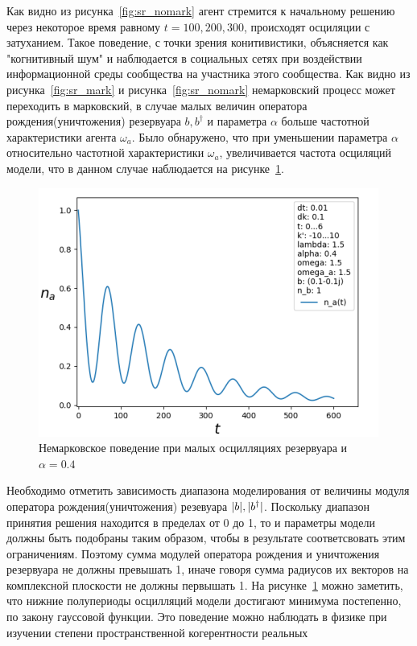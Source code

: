 Как видно из рисунка~\ref{fig:sr_nomark} агент стремится к начальному решению через некоторое время
равному $t = 100, 200, 300$, происходят осциляции с затуханием.
Такое поведение, с точки зрения конитивистики, объясняется как "когнитивный шум" и наблюдается в
социальных сетях при воздействии информационной среды сообщества на участника этого сообщества.
Как видно из рисунка~\ref{fig:sr_mark} и рисунка~\ref{fig:sr_nomark} немарковский процесс может
переходить в марковский, в случае малых величин оператора рождения(уничтожения) резервуара $b, b^{\dagger}$
и параметра $\alpha$ больше частотной характеристики агента $\omega_{a}$.
Было обнаружено, что при уменьшении параметра $\alpha$ относительно частотной характеристики $\omega_{a}$,
увеличивается частота осциляций модели, что в данном случае наблюдается на рисунке~\ref{fig:sr_more_oscillation}.
\newpage
\begin{figure}[h!]
    \centering
    \captionsetup{justification=centering}
    \includegraphics[width=0.7\linewidth]{pictures/result_second_3.png}
    \caption{Немарковское поведение при малых осцилляциях резервуара и $\alpha = 0.4$}
    \label{fig:sr_more_oscillation}
\end{figure}
Необходимо отметить зависимость диапазона моделирования от величины модуля оператора рождения(уничтожения)
резевуара $\arrowvert b \arrowvert, \arrowvert b^{\dagger} \arrowvert$.
Поскольку диапазон принятия решения находится в пределах от 0 до 1, то и параметры модели должны быть
подобраны таким образом, чтобы в результате соответсвовать этим ограничениям.
Поэтому сумма модулей оператора рождения и уничтожения резервуара не должны превышать 1, иначе говоря
сумма радиусов их векторов на комплексной плоскости не должны первышать 1.
На рисунке~\ref{fig:sr_more_oscillation} можно заметить, что нижние полупериоды осцилляций модели достигают
минимума постепенно, по закону гауссовой функции.
Это поведение можно наблюдать в физике при изучении степени пространственной когерентности реальных
